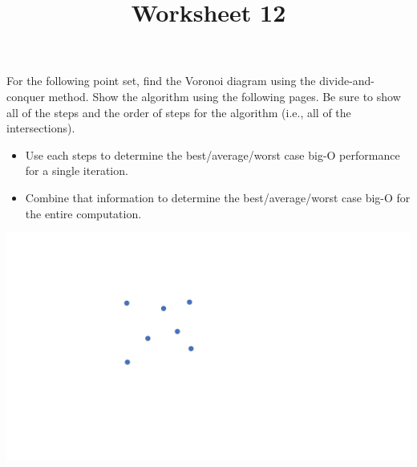 \documentclass[a4paper,12pt]{article}
\title{Worksheet 12}
\begin{document}
\maketitle

\worksheetGroundRules

\worksheetSubmission

\assignmentInstructions

For the following point set, find the Voronoi diagram using the divide-and-conquer method. Show the algorithm using the following pages. Be sure to show all of the steps and the order of steps for the algorithm (i.e., all of the intersections).


\begin{itemize}

\item Use each steps to determine the best/average/worst case big-O performance for a single iteration. 
\item Combine that information to determine the best/average/worst case big-O for the entire computation.

\end{itemize}



\begin{center}
\includegraphics[width=0.65\linewidth]{../images/voronoi7.pdf}
\end{center}




\newpage
\end{document}
